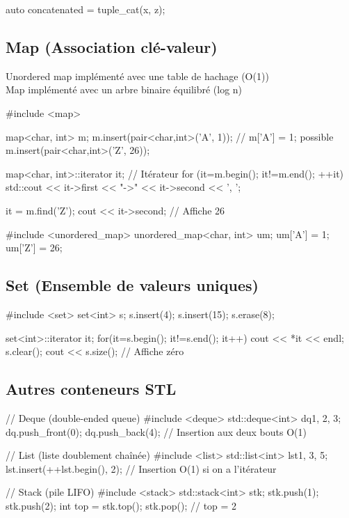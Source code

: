 \documentclass{article}
\begin{document}
\begin{multicols*}{4}
\begin{cppcode}
auto concatenated = tuple_cat(x, z);
\end{cppcode}

\subsection*{Map (Association clé-valeur)}
Unordered map implémenté avec une table de hachage (O(1))\\
Map implémenté avec un arbre binaire équilibré (log n)
\begin{cppcode}
#include <map>

map<char, int> m;
m.insert(pair<char,int>('A', 1)); // m['A'] = 1; possible
m.insert(pair<char,int>('Z', 26));

map<char, int>::iterator it; // Itérateur
for (it=m.begin(); it!=m.end(); ++it)
    std::cout << it->first << "->" << it->second << ', ';

it = m.find('Z');
cout << it->second; // Affiche 26

#include <unordered_map>
unordered_map<char, int> um;
um['A'] = 1; um['Z'] = 26;
\end{cppcode}

\subsection*{Set (Ensemble de valeurs uniques)}

\begin{cppcode}
#include <set>
set<int> s;
s.insert(4);
s.insert(15);
s.erase(8);

set<int>::iterator it;
for(it=s.begin(); it!=s.end(); it++) {
    cout << *it << endl; }
s.clear();
cout << s.size(); // Affiche zéro
\end{cppcode}

\subsection*{Autres conteneurs STL}

\begin{cppcode}
// Deque (double-ended queue)
#include <deque>
std::deque<int> dq{1, 2, 3};
dq.push_front(0); dq.push_back(4); // Insertion aux deux bouts O(1)

// List (liste doublement chaînée)
#include <list>
std::list<int> lst{1, 3, 5};
lst.insert(++lst.begin(), 2); // Insertion O(1) si on a l'itérateur

// Stack (pile LIFO)
#include <stack>
std::stack<int> stk;
stk.push(1); stk.push(2);
int top = stk.top(); stk.pop(); // top = 2


\end{cppcode}
\end{multicols*}
\end{document}

